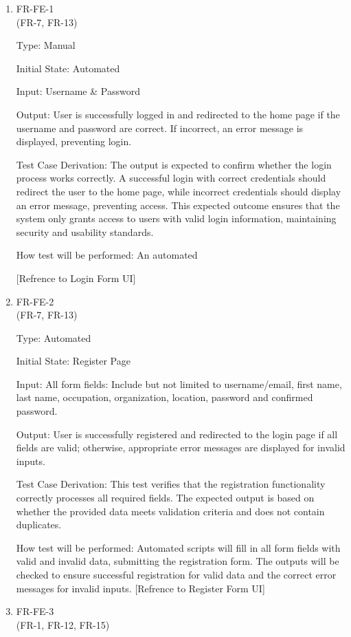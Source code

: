 \documentclass[12pt, titlepage]{article}
\begin{document}
\begin{enumerate}

\item{FR-FE-1\\} (FR-7, FR-13)

Type: Manual
			
Initial State:  Automated
					
Input: Username \& Password
					
Output: User is successfully logged in and redirected to the home page if the username and password are correct. If incorrect, an error message is displayed, preventing login.

Test Case Derivation: The output is expected to confirm whether the login process works correctly. A successful login with correct credentials should redirect the user to the home page, while incorrect credentials should display an error message, preventing access. This expected outcome ensures that the system only grants access to users with valid login information, maintaining security and usability standards.

How test will be performed: An automated

[Refrence to Login Form UI]

\item{FR-FE-2\\} (FR-7, FR-13)

Type: Automated
					
Initial State: Register Page
					
Input: All form fields: Include but not limited to username/email, first name, last name, occupation, organization, location, password and confirmed password.
					
Output: User is successfully registered and redirected to the login page if all fields are valid; otherwise, appropriate error messages are displayed for invalid inputs.

Test Case Derivation: This test verifies that the registration functionality correctly processes all required fields. The expected output is based on whether the provided data meets validation criteria and does not contain duplicates.

How test will be performed: Automated scripts will fill in all form fields with valid and invalid data, submitting the registration form. The outputs will be checked to ensure successful registration for valid data and the correct error messages for invalid inputs.
[Refrence to Register Form UI]

\item{FR-FE-3\\} (FR-1, FR-12, FR-15)


\end{enumerate}
\end{document}
